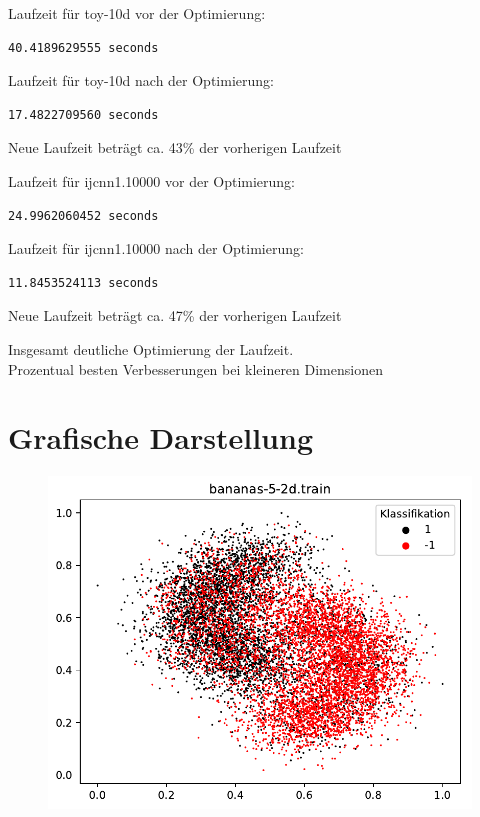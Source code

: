\documentclass{beamer}
\begin{document}
\begin{frame}[fragile]
Laufzeit für toy-10d vor der Optimierung:
\begin{verbatim}
40.4189629555 seconds
\end{verbatim}
Laufzeit für toy-10d nach der Optimierung:
\begin{verbatim}
17.4822709560 seconds
\end{verbatim}
Neue Laufzeit beträgt ca. 43\% der vorherigen Laufzeit
\end{frame}

\begin{frame}[fragile]
Laufzeit für ijcnn1.10000 vor der Optimierung:
\begin{verbatim}
24.9962060452 seconds
\end{verbatim}
Laufzeit für ijcnn1.10000 nach der Optimierung:
\begin{verbatim}
11.8453524113 seconds
\end{verbatim}
Neue Laufzeit beträgt ca. 47\% der vorherigen Laufzeit
\end{frame}

\begin{frame}
Insgesamt deutliche Optimierung der Laufzeit.\\
Prozentual besten Verbesserungen bei kleineren Dimensionen
\end{frame}

\section{Grafische Darstellung}
\begin{figure}[h]
\centering
\includegraphics[scale=0.7]{bananas-5-2d-train.pdf}
\label{bananas}
\end{figure}
\end{document}
